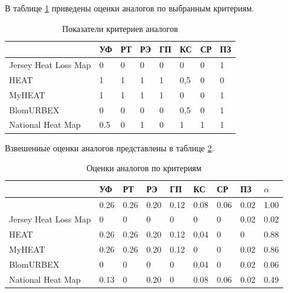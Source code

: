 	В таблице \ref{table:critval} приведены оценки аналогов по выбранным критериям.

	\begin{table}[h!]
		\begin{raggedright}
			\caption{Показатели критериев аналогов}
			\begin{tabular}{ | p{} | l | l | l | l | l | l | l | }	
				\hline
				  	                        &УФ  &РТ &РЭ &ГП &КС  &СР &ПЗ \\
				\hline
					Jersey Heat Loss Map 	&0   &0  &0  &0  &0   &0  &1 \\
				\hline
					HEAT 					&1   &1  &1  &1  &0,5 &0  &0 \\
				\hline
					MyHEAT 					&1   &1  &1  &1  &0   &0  &1 \\
				\hline
					BlomURBEX 				&0   &0  &0  &0  &0,5 &0  &1 \\
				\hline
					National Heat Map 		&0.5 &0  &1  &0  &1   &1  &1 \\
				\hline
			\end{tabular}
			\label{table:critval}
		\end{raggedright}
	\end{table}

	Взвешенные оценки аналогов представлены в таблице \ref{table:weightedest}.

	\begin{table}[h!]
		\begin{raggedright}
			\caption{Оценки аналогов по критериям}
			\begin{tabular}{ | l | l | l | l | l | l | l | l | l | }	
				\hline
				 	&УФ &РТ &РЭ &ГП &КС &СР &ПЗ &$\alpha$\\
				\hline
					&0.26 &0.26 &0.20 &0.12 &0.08 &0.06 &0.02 &1.00 \\
				\hline
					Jersey Heat Loss Map &0 &0 &0 &0 &0 &0 &0.02 &0.02 \\
				\hline
					HEAT &0.26 &0.26 &0.20 &0.12 &0,04 &0 &0 &0.88 \\
				\hline
					MyHEAT &0.26 &0.26 &0.20 &0.12 &0 &0 &0.02 &0.86 \\
				\hline
					BlomURBEX &0 &0 &0 &0 &0,04 &0 &0.02 &0.06 \\
				\hline
					National Heat Map &0.13 &0 &0.20 &0 &0.08 &0.06 &0.02 &0.49 \\
				\hline
			\end{tabular}
			\label{table:weightedest}
		\end{raggedright}
	\end{table}

